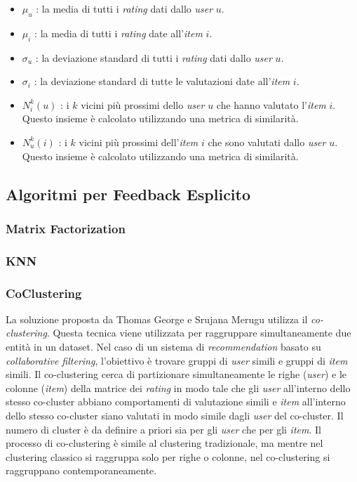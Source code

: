 \begin{itemize}
    \item $\mu_u$ : la media di tutti i \textit{rating} dati dallo \textit{user} $u$.
    \item $\mu_i$ : la media di tutti i \textit{rating} date all'\textit{item} $i$.
    \item $\sigma_u$ : la deviazione standard di tutti i \textit{rating} dati dallo \textit{user} $u$.
    \item $\sigma_i$ : la deviazione standard di tutte le valutazioni date all'\textit{item} $i$.
    \item $N_i^k(u)$ : i $k$ vicini più prossimi dello \textit{user} $u$ che hanno valutato l'\textit{item} $i$. Questo insieme è calcolato utilizzando una metrica di similarità.
    \item $N_u^k(i)$ : i $k$ vicini più prossimi dell'\textit{item} $i$ che sono valutati dallo \textit{user} $u$. Questo insieme è calcolato utilizzando una metrica di similarità.
\end{itemize}

\subsection{Algoritmi per Feedback Esplicito}\label{algoritmi-per-feedback-esplicito}

\subsubsection{Matrix Factorization}\label{matrix-factorization}

\subsubsection{KNN}\label{knn}

\subsubsection{CoClustering}\label{coclustering}

La soluzione proposta da Thomas George e Srujana Merugu\cite{Co-Clustering} utilizza il \textit{co-clustering}. Questa tecnica viene utilizzata per raggruppare simultaneamente due entità in un dataset. Nel caso di un sistema di \textit{recommendation} basato su \textit{collaborative filtering}, l'obiettivo è trovare gruppi di \textit{user} simili e gruppi di \textit{item} simili. Il co-clustering cerca di partizionare simultaneamente le righe (\textit{user}) e le colonne (\textit{item}) della matrice dei \textit{rating} in modo tale che gli \textit{user} all'interno dello stesso co-cluster abbiano comportamenti di valutazione simili e \textit{item} all'interno dello stesso co-cluster siano valutati in modo simile dagli \textit{user} del co-cluster. Il numero di cluster è da definire a priori sia per gli \textit{user} che per gli \textit{item}. Il processo di co-clustering è simile al clustering tradizionale, ma mentre nel clustering classico si raggruppa solo per righe o colonne, nel co-clustering si raggruppano contemporaneamente. 

